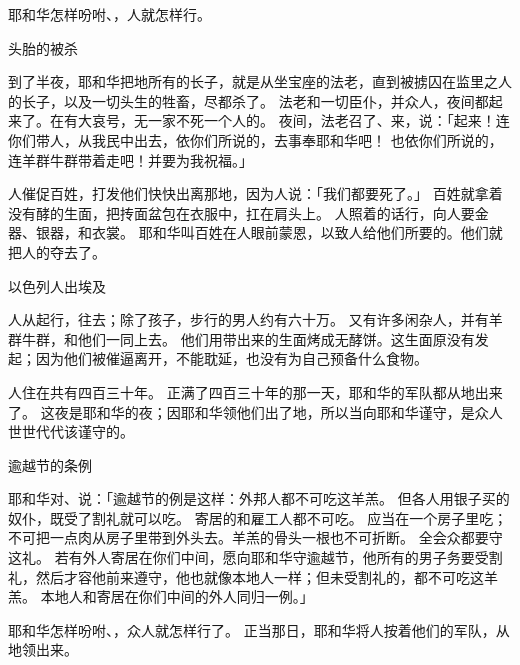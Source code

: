 {\par }{\PP {}耶和华怎样吩咐{}、{}，{}人就怎样行。
\par }{\SH 头胎的被杀
\par }{\PP {}到了半夜，耶和华把{}地所有的长子，就是从坐宝座的法老，直到被掳囚在监里之人的长子，以及一切头生的牲畜，尽都杀了。
法老和一切臣仆，并{}众人，夜间都起来了。在{}有大哀号，无一家不死一个人的。
夜间，法老召了{}、{}来，说：「起来！连你们带{}人，从我民中出去，依你们所说的，去事奉耶和华吧！
也依你们所说的，连羊群牛群带着走吧！并要为我祝福。」
\par }{\PP {}人催促百姓，打发他们快快出离那地，因为{}人说：「我们都要死了。」
百姓就拿着没有酵的生面，把抟面盆包在衣服中，扛在肩头上。
人照着{}的话行，向{}人要金器、银器，和衣裳。
耶和华叫百姓在{}人眼前蒙恩，以致{}人给他们所要的。他们就把{}人的{}夺去了。
\par }{\SH 以色列人出埃及
\par }{\PP {}人从{}起行，往{}去；除了{}孩子，步行的男人约有六十万。
又有许多闲杂人，并有羊群牛群，和他们一同上去。
他们用{}带出来的生面烤成无酵饼。这生面原没有发起；因为他们被催逼离开{}，不能耽延，也没有为自己预备什么食物。
\par }{\PP {}人住在{}共有四百三十年。
正满了四百三十年的那一天，耶和华的军队都从{}地出来了。
这夜是耶和华的夜；因耶和华领他们出了{}地，所以当向耶和华谨守，是{}众人世世代代该谨守的。
\par }{\SH 逾越节的条例
\par }{\PP {}耶和华对{}、{}说：「逾越节的例是这样：外邦人都不可吃这羊羔。
但各人用银子买的奴仆，既受了割礼就可以吃。
寄居的和雇工人都不可吃。
应当在一个房子里吃；不可把一点肉从房子里带到外头去。羊羔的骨头一根也不可折断。
全会众都要守这礼。
若有外人寄居在你们中间，愿向耶和华守逾越节，他所有的男子务要受割礼，然后才容他前来遵守，他也就像本地人一样；但未受割礼的，都不可吃这羊羔。
本地人和寄居在你们中间的外人同归一例。」
\par }{\PP {}耶和华怎样吩咐{}、{}，{}众人就怎样行了。
正当那日，耶和华将{}人按着他们的军队，从{}地领出来。

}
